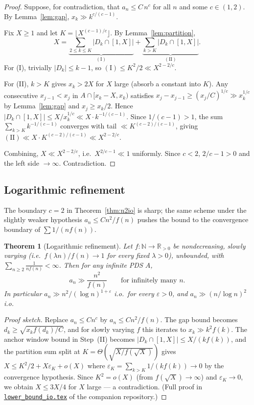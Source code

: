 \documentclass[11pt]{article}
\newtheorem{theorem}{Theorem}
\begin{document}
\begin{proof}
Suppose, for contradiction, that $a_n \leq C\, n^c$ for all $n$ and some
$c \in (1, 2)$. By Lemma~\ref{lem:gap}, $x_k \gg k^{c/(c-1)}$.

Fix $X \geq 1$ and let $K = \lfloor X^{(c-1)/c} \rfloor$. By
Lemma~\ref{lem:partition},
\[
   X = \underbrace{\sum_{2 \leq k \leq K} |D_k \cap [1, X]|}_{\mathrm{(I)}}
     + \underbrace{\sum_{k > K} |D_k \cap [1, X]|}_{\mathrm{(II)}}.
\]
For (I), trivially $|D_k| \leq k-1$, so $(\mathrm{I}) \leq K^2/2
\ll X^{2-2/c}$.

For (II), $k > K$ gives $x_k > 2X$ for $X$ large (absorb a constant into
$K$). Any consecutive $x_{j-1} < x_j$ in $A \cap [x_k - X, x_k)$ satisfies
$x_j - x_{j-1} \geq (x_j/C)^{1/c} \gg x_k^{1/c}$ by Lemma~\ref{lem:gap}
and $x_j \geq x_k/2$. Hence
$|D_k \cap [1, X]| \leq X / x_k^{1/c} \ll X \cdot k^{-1/(c-1)}$.
Since $1/(c-1) > 1$, the sum $\sum_{k > K} k^{-1/(c-1)}$ converges with
tail $\ll K^{(c-2)/(c-1)}$, giving
$(\mathrm{II}) \ll X \cdot K^{(c-2)/(c-1)} \ll X^{2-2/c}$.

Combining, $X \ll X^{2-2/c}$, i.e.\ $X^{2/c - 1} \ll 1$ uniformly.
Since $c < 2$, $2/c - 1 > 0$ and the left side $\to \infty$. Contradiction.
\end{proof}

\subsection{Logarithmic refinement}

The boundary $c = 2$ in Theorem~\ref{thm:n2io} is sharp; the same scheme
under the slightly weaker hypothesis $a_n \leq C n^2/f(n)$ pushes the
bound to the convergence boundary of $\sum 1/(nf(n))$.

\begin{theorem}[Logarithmic refinement]\label{thm:n2overf}
Let $f \colon \mathbb{N} \to \mathbb{R}_{>0}$ be nondecreasing, slowly
varying (i.e.\ $f(\lambda n)/f(n) \to 1$ for every fixed $\lambda > 0$),
unbounded, with $\sum_{n \geq 2} \frac{1}{n f(n)} < \infty$. Then for any
infinite PDS $A$,
\[
   a_n \gg \frac{n^2}{f(n)} \qquad \text{for infinitely many } n.
\]
In particular $a_n \gg n^2/(\log n)^{1+\varepsilon}$ i.o.\ for every
$\varepsilon > 0$, and $a_n \gg (n/\log n)^2$ i.o.
\end{theorem}

\begin{proof}[Proof sketch]
Replace $a_n \leq Cn^c$ by $a_n \leq Cn^2/f(n)$. The gap bound becomes
$d_k \geq \sqrt{x_k f(d_k)/C}$, and for slowly varying $f$ this iterates
to $x_k \gg k^2 f(k)$. The anchor window bound in Step~(II) becomes
$|D_k \cap [1, X]| \leq X / (k f(k))$, and the partition sum split at
$K = \Theta(\sqrt{X/f(\sqrt X)})$ gives
$X \leq K^2/2 + X \varepsilon_K + o(X)$ where
$\varepsilon_K = \sum_{k > K} 1/(k f(k)) \to 0$ by the convergence
hypothesis. Since $K^2 = o(X)$ (from $f(\sqrt X) \to \infty$) and
$\varepsilon_K \to 0$, we obtain $X \leq 3X/4$ for $X$ large --- a
contradiction. (Full proof in
\href{run:lower_bound_io.tex}{\texttt{lower\_bound\_io.tex}} of the
companion repository.)
\end{proof}
\end{document}
